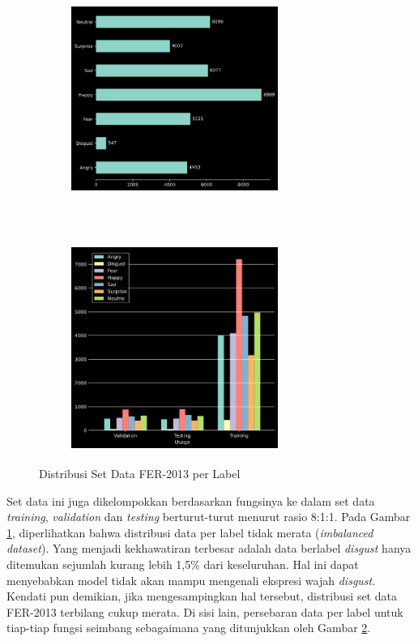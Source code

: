 \begin{figure}[!ht]
    \centering
    \begin{subfigure}[t]{6.75cm}
        \includegraphics[width=6.75cm,height=6.75cm]{gambar/fer2013_label_dist1.png}
        \caption{}
        \label{fig:distribusifer2013a}
    \end{subfigure}
    ~~~
    \begin{subfigure}[t]{6.75cm}
        \includegraphics[width=6.75cm,height=6.75cm]{gambar/fer2013_label_dist4.png}
        \caption{}
        \label{fig:distribusifer2013b}
    \end{subfigure}
    \caption{Distribusi Set Data FER-2013 per Label}
    \label{fig:distribusifer2013}
\end{figure}
Set data ini juga dikelompokkan berdasarkan fungsinya ke dalam set data \textit{training}, \textit{validation} dan \textit{testing} berturut-turut menurut rasio 8{:}1{:}1. Pada Gambar \ref{fig:distribusifer2013a}, diperlihatkan bahwa distribusi data per label tidak merata (\textit{imbalanced dataset}). Yang menjadi kekhawatiran terbesar adalah data berlabel \textit{disgust} hanya ditemukan sejumlah kurang lebih 1,5\% dari keseluruhan. Hal ini dapat menyebabkan model tidak akan mampu mengenali ekspresi wajah \textit{disgust}. Kendati pun demikian, jika mengesampingkan hal tersebut, distribusi set data FER-2013 terbilang cukup merata. Di sisi lain, persebaran data per label untuk tiap-tiap fungsi seimbang sebagaimana yang ditunjukkan oleh Gambar \ref{fig:distribusifer2013b}.

